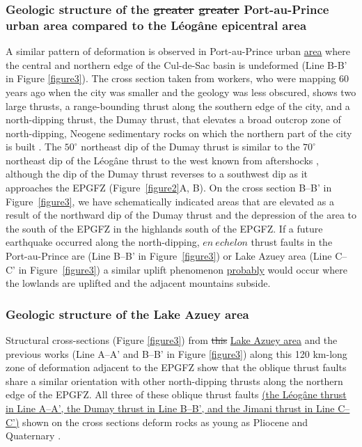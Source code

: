 \documentclass[linenumbers,draft]{agujournal}
\providecommand{\DIFdel}[1]{{\protect\color{red}\sout{#1}}}                      %
\providecommand{\DIFaddbegin}{} %
\providecommand{\DIFaddend}{} %
\providecommand{\DIFdelbegin}{} %
\providecommand{\DIFdelend}{} %
\begin{document}
\subsubsection{Geologic structure of the \DIFdelbegin \DIFdel{greater }\DIFdelend \DIFaddbegin \st{greater} \DIFaddend Port-au-Prince urban area compared to the L\'eog\^ane epicentral area} 
A similar pattern of deformation is observed in Port-au-Prince urban \DIFaddbegin \ul{area} \DIFaddend where the central and northern edge of the Cul-de-Sac basin is undeformed \citep{massoni1955haiti,cox2011shear,mchugh2011offshore,saint2015seismotectonics} (Line B-B' in Figure \ref{figure3}). The cross section taken from workers, who were mapping 60 years ago when the city was smaller and the geology was less obscured, shows two large thrusts, a range-bounding thrust along the southern edge of the city, and a north-dipping thrust, the Dumay thrust, that elevates a broad outcrop zone of north-dipping, Neogene sedimentary rocks on which the northern part of the city is built \citep{rathje2014geotechnical}. The $50^{\circ}$ northeast dip of the Dumay thrust is similar to the $70^{\circ}$ northeast dip of the L\'eog\^ane thrust to the west known from aftershocks \citep{douilly2013crustal,douilly2015three}, although the dip of the Dumay thrust reverses to a southwest dip as it approaches the EPGFZ (Figure~\ref{figure2}A, B). On the cross section B--B' in Figure~\ref{figure3}, we have schematically indicated areas that are elevated as a result of the northward dip of the Dumay thrust and the depression of the area to the south of the EPGFZ in the highlands south of the EPGFZ. If a future earthquake occurred along the north-dipping, $en~echelon$ thrust faults in the Port-au-Prince are (Line B--B' in Figure~\ref{figure3}) or Lake Azuey area (Line C--C' in Figure~\ref{figure3}) a similar uplift phenomenon \DIFaddbegin \ul{probably} \DIFaddend would occur where the lowlands are uplifted and the adjacent mountains subside.

\subsubsection{Geologic structure of the Lake Azuey area} 
Structural cross-sections (Figure \ref{figure3}) from \DIFdelbegin \DIFdel{this }\DIFdelend \DIFaddbegin \ul{Lake Azuey area} \DIFaddend and the previous works \citep{massoni1955haiti,bourgueil1988synthese,cox2011shear,douilly2015three} (Line A--A' and B--B' in Figure \ref{figure3}) along this 120 km-long zone of deformation adjacent to the EPGFZ show that the oblique thrust faults share a similar orientation with other north-dipping thrusts along the northern edge of the EPGFZ. All three of these oblique thrust faults \DIFaddbegin \ul{(the L\'eog\^ane thrust in Line A--A', the Dumay thrust in Line B--B', and the Jimani thrust in Line C--C')} \DIFaddend shown on the cross sections deform rocks as young as Pliocene and Quaternary \citep{saint2015seismotectonics}. 
\end{document}
